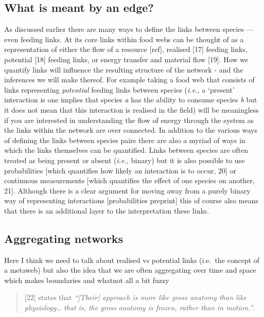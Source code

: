 \documentclass[
]{article}
\begin{document}
\subsection{What is meant by an edge?}\label{what-is-meant-by-an-edge}

As discussed earlier there are many ways to define the links between
species --- even feeding links. At its core links within food webs can
be thought of as a representation of either the flow of a resource
{[}ref{]}, realised {[}17{]} feeding links, potential {[}18{]} feeding
links, or energy transfer and material flow {[}19{]}. How we quantify
links will influence the resulting structure of the network - and the
inferences we will make thereof. For example taking a food web that
consists of links representing \emph{potential} feeding links between
species (\emph{i.e.,} a `present' interaction is one implies that
species \emph{a} has the ability to consume species \emph{b} but it does
not mean that this interaction is realised in the field) will be
meaningless if you are interested in understanding the flow of energy
through the system as the links within the network are over connected.
In addition to the various ways of defining the links between species
pairs there are also a myriad of ways in which the links themselves can
be quantified. Links between species are often treated as being present
or absent (\emph{i.e.,} binary) but it is also possible to use
probabilities {[}which quantifies how likely an interaction is to occur,
20{]} or continuous measurements {[}which quantifies the effect of one
species on another, 21{]}. Although there is a clear argument for moving
away from a purely binary way of representing interactions
{[}probabilities preprint{]} this of course also means that there is an
additional layer to the interpretation these links.

\subsection{Aggregating networks}\label{aggregating-networks}

Here I think we need to talk about realised vs potential links (i.e.~the
concept of a metaweb) but also the idea that we are often aggregating
over time and space which makes boundaries and whatnot all a bit fuzzy

\begin{quote}
{[}22{]} states that \emph{``{[}Their{]} approach is more like gross
anatomy than like physiology\ldots{} that is, the gross anatomy is
frozen, rather than in motion.''}.
\end{quote}
\end{document}
